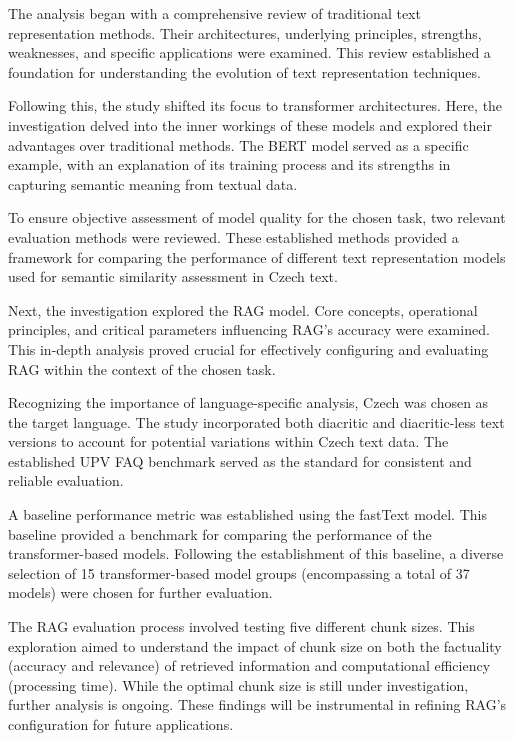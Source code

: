 The analysis began with a comprehensive review of traditional text representation methods.
Their architectures, underlying principles, strengths, weaknesses, and specific applications were examined.
This review established a foundation for understanding the evolution of text representation techniques.

Following this, the study shifted its focus to transformer architectures.
Here, the investigation delved into the inner workings of these models and explored their advantages over traditional methods.
The \ac{BERT} model served as a specific example, with an explanation of its training process and its strengths in capturing semantic meaning from textual data.

To ensure objective assessment of model quality for the chosen task, two relevant evaluation methods were reviewed.
These established methods provided a framework for comparing the performance of different text representation models used for semantic similarity assessment in Czech text.

Next, the investigation explored the \ac{RAG} model.
Core concepts, operational principles, and critical parameters influencing \ac{RAG}'s accuracy were examined.
This in-depth analysis proved crucial for effectively configuring and evaluating \ac{RAG} within the context of the chosen task.

Recognizing the importance of language-specific analysis, Czech was chosen as the target language.
The study incorporated both diacritic and diacritic-less text versions to account for potential variations within Czech text data.
The established UPV FAQ benchmark served as the standard for consistent and reliable evaluation.

A baseline performance metric was established using the fastText model.
This baseline provided a benchmark for comparing the performance of the transformer-based models.
Following the establishment of this baseline, a diverse selection of 15 transformer-based model groups (encompassing a total of 37 models) were chosen for further evaluation.

The \ac{RAG} evaluation process involved testing five different chunk sizes.
This exploration aimed to understand the impact of chunk size on both the factuality (accuracy and relevance) of retrieved information and computational efficiency (processing time).
While the optimal chunk size is still under investigation, further analysis is ongoing.
These findings will be instrumental in refining \ac{RAG}'s configuration for future applications.

